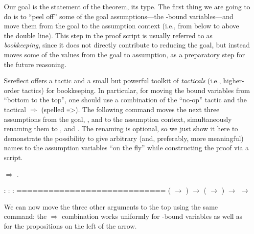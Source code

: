 Our goal is the statement of the theorem, its type. The first thing we
are going to do is to ``peel off'' some of the goal assumptions---the
\coqdockw{\ensuremath{\forall}}-bound variables---and move them from the goal to the
assumption context (i.e., from below to above the double line). This
step in the proof script is usually referred to as \textit{bookkeeping},
since it does not directly contribute to reducing the goal, but
instead moves some of the values from the goal to assumption, as a
preparatory step for the future reasoning.


Ssreflect offers a tactic and a small but powerful toolkit of
\textit{tacticals} (i.e., higher-order tactics) for bookkeeping. In
particular, for moving the bound variables from ``bottom to the top'',
one should use a combination of the ``no-op'' tactic 
and the tactical \ensuremath{\Rightarrow} \ssrtl{=>}(spelled \texttt{=}>). The following
command moves the next three assumptions from the goal, ,  and
 to the assumption context, simultaneously renaming them to ,
 and . The renaming is optional, so we just show it here to
demonstrate the possibility to give arbitrary (and, preferably, more
meaningful) names to the assumption variables ``on the fly'' while
constructing the proof via a script.


\begin{coqdoccode}
\coqdocemptyline
\coqdocnoindent
{}\ensuremath{\Rightarrow}   .\coqdoceol
\end{coqdoccode}
\coqdoceol
\coqdocemptyline
\coqdocindent{1.00em}
 : \coqdoceol
\coqdocindent{1.00em}
 : \coqdoceol
\coqdocindent{1.00em}
 : \coqdoceol
\coqdocindent{1.00em}
============================\coqdoceol
\coqdocindent{1.50em}
( \ensuremath{\rightarrow} ) \ensuremath{\rightarrow} ( \ensuremath{\rightarrow} ) \ensuremath{\rightarrow}  \ensuremath{\rightarrow} 

\coqdocemptyline


We can now move the three other arguments to the top using the same
command: the \ensuremath{\Rightarrow} combination works uniformly for \coqdockw{\ensuremath{\forall}}-bound
variables as well as for the propositions on the left of the arrow.


